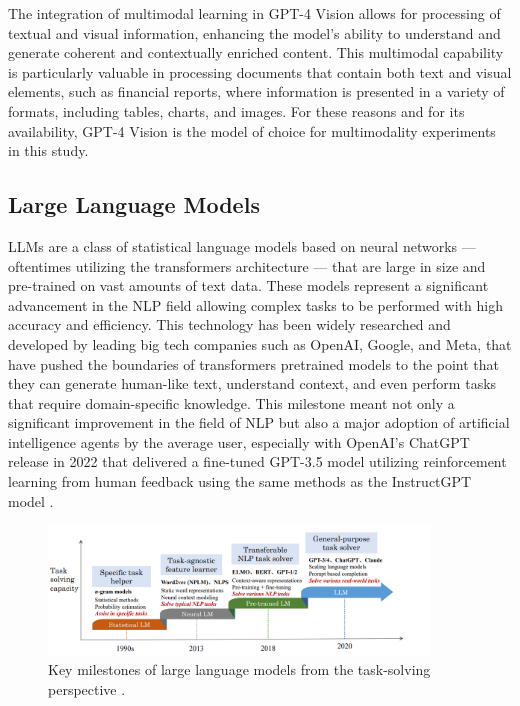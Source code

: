 \documentclass[english, 12pt, a4paper, elec, utf8, a-2b, online]{aaltothesis}
\begin{document}
The integration of multimodal learning in GPT-4 Vision allows for processing of textual and visual information, enhancing the model's ability to understand and generate coherent and contextually enriched content.
This multimodal capability is particularly valuable in processing documents that contain both text and visual elements, such as financial reports, where information is presented in a variety of formats, including tables, charts, and images.
For these reasons and for its availability, GPT-4 Vision is the model of choice for multimodality experiments in this study.

\subsection{Large Language Models}

\ac{LLM}s are a class of statistical language models based on neural networks --- oftentimes utilizing the transformers architecture --- that are large in size and pre-trained on vast amounts of text data.
These models represent a significant advancement in the \ac{NLP} field allowing complex tasks to be performed with high accuracy and efficiency.
This technology has been widely researched and developed by leading big tech companies such as OpenAI, Google, and Meta, \cite{Brown2020, Devlin2019, Radford2021, OpenAI2023GPT4, Gemini2022, Gemini2024} that have pushed the boundaries of transformers pretrained models to the point that they can generate human-like text, understand context, and even perform tasks that require domain-specific knowledge.
This milestone meant not only a significant improvement in the field of \ac{NLP} but also a major adoption of artificial intelligence agents by the average user, especially with OpenAI's ChatGPT release in 2022 that delivered a fine-tuned GPT-3.5 model utilizing reinforcement learning from human feedback using the same methods as the InstructGPT model \cite{Ouyang2022}.

\begin{figure}[H]
    \centering
    \includegraphics[width=0.9\textwidth]{images/llms_milestones.png}
    \caption{Key milestones of large language models from the task-solving perspective \cite{Zhao2023}.}
    \label{fig:transformers_milestones}
\end{figure}
\end{document}
